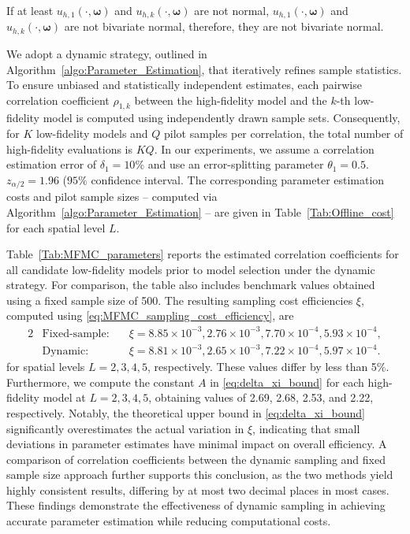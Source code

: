If at least $u_{h,1}(\cdot, \boldsymbol{\omega})$ and $u_{h,k}(\cdot, \boldsymbol{\omega})$ are not normal, $u_{h,1}(\cdot, \boldsymbol{\omega})$ and $u_{h,k}(\cdot, \boldsymbol{\omega})$ are not bivariate normal, therefore, they are not bivariate normal.


We adopt a dynamic strategy, outlined in Algorithm~\ref{algo:Parameter_Estimation}, that iteratively refines sample statistics. To ensure unbiased and statistically independent estimates, each pairwise correlation coefficient $\rho_{1,k}$ between the high-fidelity model and the $k$-th low-fidelity model is computed using independently drawn sample sets. Consequently, for $K$ low-fidelity models and $Q$ pilot samples per correlation, the total number of high-fidelity evaluations is $KQ$. In our experiments, we assume a correlation estimation error of $\delta_1 = 10\%$ and use an error-splitting parameter $\theta_1 = 0.5$. $z_{\alpha/2} = 1.96$ ($95\%$ confidence interval. The corresponding parameter estimation costs and pilot sample sizes -- computed via Algorithm~\ref{algo:Parameter_Estimation} -- are given in Table~\ref{Tab:Offline_cost} for each spatial level $L$.



Table~\ref{Tab:MFMC_parameters} reports the estimated correlation coefficients for all candidate low-fidelity models prior to model selection under the dynamic strategy. For comparison, the table also includes benchmark values obtained using a fixed sample size of 500. The resulting sampling cost efficiencies $\xi$, computed using \eqref{eq:MFMC_sampling_cost_efficiency}, are
%
\begin{alignat*}{2}
    &\text{Fixed-sample:}\quad &\xi = 8.85\times 10^{-3}, 2.76\times 10^{-3}, 7.70\times 10^{-4}, 5.93\times 10^{-4},\\
    &\text{Dynamic:}\quad &\xi =8.81\times 10^{-3}, 2.65\times 10^{-3}, 7.22\times 10^{-4},  5.97\times 10^{-4}.
\end{alignat*}
%
for spatial levels $L=2,3,4,5$, respectively. These values differ by less than 5\%.
Furthermore, we compute the constant $A$ in \eqref{eq:delta_xi_bound} for each high-fidelity model at $L=2,3,4,5$, obtaining values of 2.69, 2.68, 2.53, and 2.22, respectively. Notably, the theoretical upper bound in \eqref{eq:delta_xi_bound} significantly overestimates the actual variation in $\xi$, indicating that small deviations in parameter estimates have minimal impact on overall efficiency. A comparison of correlation coefficients between the dynamic sampling and fixed sample size approach further supports this conclusion, as the two methods yield highly consistent results, differing by at most two decimal places in most cases. These findings demonstrate the effectiveness of dynamic sampling in achieving accurate parameter estimation while reducing computational costs.







